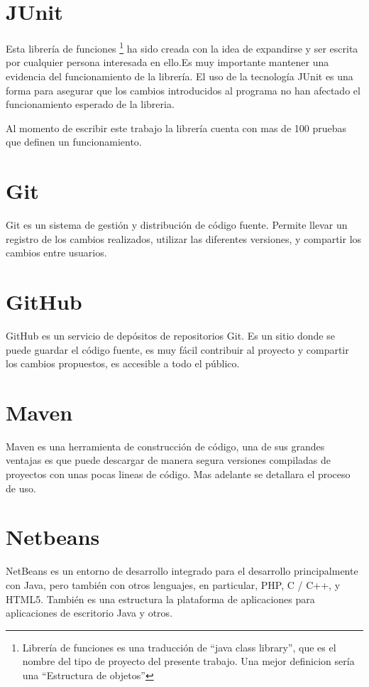 	\section{JUnit}

		Esta librería de funciones \footnote{Librería de funciones es una traducción de ``java class library'', que es el nombre del tipo de proyecto del presente trabajo. Una mejor definicion sería una ``Estructura de objetos''} ha sido creada con la idea de expandirse y ser escrita por cualquier persona interesada en ello.Es muy importante mantener una evidencia del funcionamiento de la librería. El uso de la tecnología JUnit es una forma para asegurar que los cambios introducidos al programa no han afectado el funcionamiento esperado de la libreria.

		Al momento de escribir este trabajo la librería cuenta con mas de 100 pruebas que definen un funcionamiento.
	\section{Git}

		Git es un sistema de gestión y distribución de código fuente. Permite llevar un registro de los cambios realizados, utilizar las diferentes versiones, y compartir los cambios entre usuarios.

	\section{GitHub}

		GitHub es un servicio de depósitos de repositorios Git. Es un sitio donde se puede guardar el código fuente, es muy fácil contribuir al proyecto y compartir los cambios propuestos, es accesible a todo el público.

	\section{Maven}

		Maven es una herramienta de construcción de código, una de sus grandes ventajas es que puede descargar de manera segura versiones compiladas de proyectos con unas pocas lineas de código. Mas adelante se detallara el proceso de uso.

	\section{Netbeans}
		NetBeans es un entorno de desarrollo integrado para el desarrollo principalmente con Java, pero también con otros lenguajes, en particular, PHP, C / C++, y HTML5. También es una estructura la plataforma de aplicaciones para aplicaciones de escritorio Java y otros.
	

